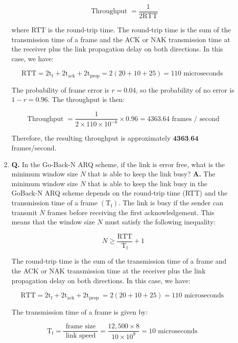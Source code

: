 \documentclass[main.tex]{subfiles}
\begin{document}
\begin{enumerate}
\begin{enumerate}
        $$
        \text { Throughput }=\frac{1}{2 \mathrm{RTT}}
        $$
        
        where RTT is the round-trip time. The round-trip time is the sum of the transmission time of a frame and the ACK or NAK transmission time at the receiver plus the link propagation delay on both directions. In this case, we have:
        
        $$
        \mathrm{RTT}=2 \mathrm{t}_{\mathrm{f}}+2 \mathrm{t}_{\mathrm{ack}}+2 \mathrm{t}_{\mathrm{prop}}=2(20+10+25)=110 \text { microseconds }
        $$
        
        The probability of frame error is $r=0.04$, so the probability of no error is $1-r=0.96$. The throughput is then:
        
        $$
        \text { Throughput }=\frac{1}{2 \times 110 \times 10^{-6}} \times 0.96=4363.64 \text { frames } / \text { second }
        $$
        
        Therefore, the resulting throughput is approximately $\mathbf{4 3 6 3 . 6 4}$ frames/second.
        
        \item \textbf{Q.}  In the Go-Back-N ARQ scheme, if the link is error free, what is the minimum window size $N$ that is able to keep the link busy? \textbf{A.} The minimum window size $N$ that is able to keep the link busy in the GoBack-N ARQ scheme depends on the round-trip time (RTT) and the transmission time of a frame $\left(\mathrm{T}_{\mathrm{f}}\right)$. The link is busy if the sender can transmit $N$ frames before receiving the first acknowledgement. This means that the window size $N$ must satisfy the following inequality:
        
        $$
        N \geq \frac{\mathrm{RTT}}{\mathrm{T}_{\mathrm{f}}}+1
        $$
        
        The round-trip time is the sum of the transmission time of a frame and the ACK or NAK transmission time at the receiver plus the link propagation delay on both directions. In this case, we have:
        
        $$
        \mathrm{RTT}=2 \mathrm{t}_{\mathrm{f}}+2 \mathrm{t}_{\mathrm{ack}}+2 \mathrm{t}_{\text {prop }}=2(20+10+25)=110 \text { microseconds }
        $$
        
        The transmission time of a frame is given by:
        
        $$
        \mathrm{T}_{\mathrm{f}}=\frac{\text { frame size }}{\text { link speed }}=\frac{12,500 \times 8}{10 \times 10^9}=10 \text { microseconds }
        $$
        

\end{enumerate}
\end{enumerate}
\end{document}
